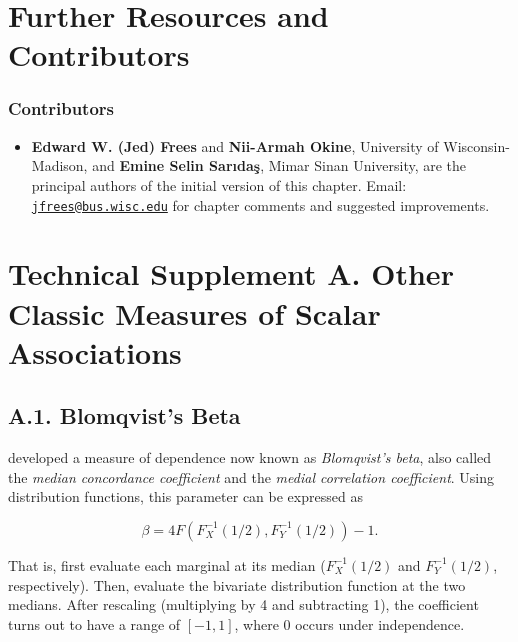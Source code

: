 \documentclass[]{book}
\providecommand{\tightlist}{%
  \setlength{\itemsep}{0pt}\setlength{\parskip}{0pt}}
\theoremstyle{definition}
\theoremstyle{definition}
\theoremstyle{definition}
\theoremstyle{remark}
\begin{document}
\section{Further Resources and
Contributors}\label{Dep:further-reading-and-resources}

\subsubsection*{Contributors}\label{contributors-6}

\begin{itemize}
\tightlist
\item
  \textbf{Edward W. (Jed) Frees} and \textbf{Nii-Armah Okine},
  University of Wisconsin-Madison, and \textbf{Emine Selin Sarıdaş},
  Mimar Sinan University, are the principal authors of the initial
  version of this chapter. Email:
  \href{mailto:jfrees@bus.wisc.edu}{\nolinkurl{jfrees@bus.wisc.edu}} for
  chapter comments and suggested improvements.
\end{itemize}

\section*{Technical Supplement A. Other Classic Measures of Scalar
Associations}\label{technical-supplement-a.-other-classic-measures-of-scalar-associations}

\subsection*{A.1. Blomqvist's Beta}\label{a.1.-blomqvists-beta}

\citet{blomqvist1950measure} developed a measure of dependence now known
as \emph{Blomqvist's beta}, also called the \emph{median concordance
coefficient} and the \emph{medial correlation coefficient}. Using
distribution functions, this parameter can be expressed as

\begin{equation*}
\beta = 4F\left(F^{-1}_X(1/2),F^{-1}_Y(1/2) \right) - 1.
\end{equation*}

That is, first evaluate each marginal at its median (\(F^{-1}_X(1/2)\)
and \(F^{-1}_Y(1/2)\), respectively). Then, evaluate the bivariate
distribution function at the two medians. After rescaling (multiplying
by 4 and subtracting 1), the coefficient turns out to have a range of
\([-1,1]\), where 0 occurs under independence.
\end{document}
